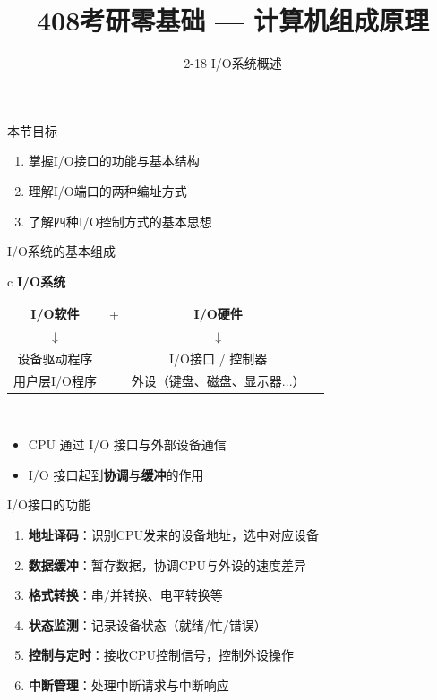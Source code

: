 \documentclass[10pt, aspectratio=169]{beamer}
\title{408考研零基础 --- 计算机组成原理}
\subtitle{2-18 I/O系统概述}
\author{}
\date{}
\begin{document}
\begin{frame}{本节目标}
    \begin{enumerate}
        \item 掌握I/O接口的功能与基本结构
        \item 理解I/O端口的两种编址方式
        \item 了解四种I/O控制方式的基本思想
    \end{enumerate}
\end{frame}

\begin{frame}{I/O系统的基本组成}
    \begin{center}
        \begin{tabular}{c}
            \textbf{I/O系统} \\
            \hline
            \begin{tabular}{cccc}
                \textbf{I/O软件} & + & \textbf{I/O硬件} \\
                ↓ & & ↓ \\
                设备驱动程序 & & I/O接口 / 控制器 \\
                用户层I/O程序 & & 外设（键盘、磁盘、显示器...） \\
            \end{tabular} \\
            \hline
        \end{tabular}
    \end{center}
    \vspace{0.5em}
    \begin{itemize}
        \item CPU 通过 I/O 接口与外部设备通信
        \item I/O 接口起到\textbf{协调}与\textbf{缓冲}的作用
    \end{itemize}
\end{frame}

\begin{frame}{I/O接口的功能}
    \begin{enumerate}
        \item \textbf{地址译码}：识别CPU发来的设备地址，选中对应设备
        \item \textbf{数据缓冲}：暂存数据，协调CPU与外设的速度差异
        \item \textbf{格式转换}：串/并转换、电平转换等
        \item \textbf{状态监测}：记录设备状态（就绪/忙/错误）
        \item \textbf{控制与定时}：接收CPU控制信号，控制外设操作
        \item \textbf{中断管理}：处理中断请求与中断响应
    \end{enumerate}
\end{frame}
\end{document}
